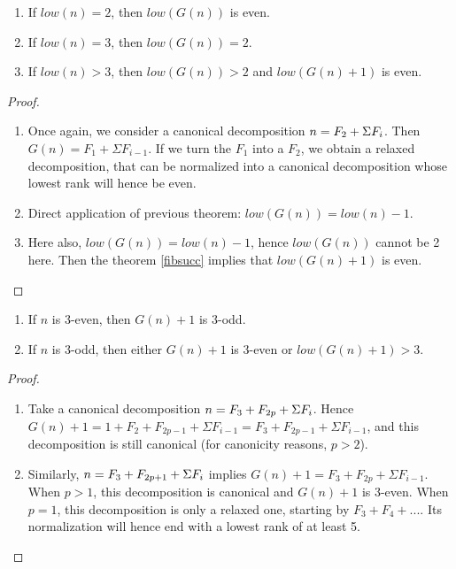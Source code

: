 \documentclass[a4paper,11pt]{article}
\begin{document}
\begin{theorem}\label{Gclass2}
\noindent
\begin{enumerate}
\item If $low(n)=2$, then $low(G(n))$ is even.
\item If $low(n)=3$, then $low(G(n))=2$.
\item If $low(n)>3$, then $low(G(n))>2$ and $low(G(n)+1)$ is even.
\end{enumerate}
\end{theorem}
\begin{proof}
\noindent
\begin{enumerate}
\item Once again, we consider a canonical decomposition
$n = F_2 + \Sigma F_i$. Then $G(n) = F_1 + \Sigma F_{i-1}$. If we
turn the $F_1$ into a $F_2$, we obtain a relaxed decomposition,
that can be normalized into a canonical decomposition whose
lowest rank will hence be even.
\item Direct application of previous theorem: $low(G(n))=low(n)-1$.
\item Here also, $low(G(n))=low(n)-1$, hence $low(G(n))$ cannot
be 2 here. Then the theorem \ref{fibsucc} implies that $low(G(n)+1)$ is even.
\end{enumerate}
\end{proof}

\begin{theorem}\label{Gthree}
\noindent
\begin{enumerate}
\item If $n$ is 3-even, then $G(n)+1$ is 3-odd.
\item If $n$ is 3-odd, then either $G(n)+1$ is 3-even or $low(G(n)+1)>3$.
\end{enumerate}
\end{theorem}
\begin{proof}
\noindent
\begin{enumerate}
\item Take a canonical decomposition $n=F_3+F_{2p}+\Sigma F_i$.
Hence $G(n)+1=1+F_2+F_{2p-1}+\Sigma F_{i-1}=F_3+F_{2p-1}+\Sigma F_{i-1}$,
and this decomposition is still canonical (for canonicity reasons,
$p>2$).
\item Similarly, $n=F_3+F_{2p+1}+\Sigma F_i$ implies
$G(n)+1=F_3+F_{2p}+\Sigma F_{i-1}$. When $p>1$, this decomposition
is canonical and $G(n)+1$ is 3-even. When $p=1$, this decomposition
is only a relaxed one, starting by $F_3+F_4+...$. Its normalization
will hence end with a lowest rank of at least 5.
\end{enumerate}
\end{proof}
\end{document}
